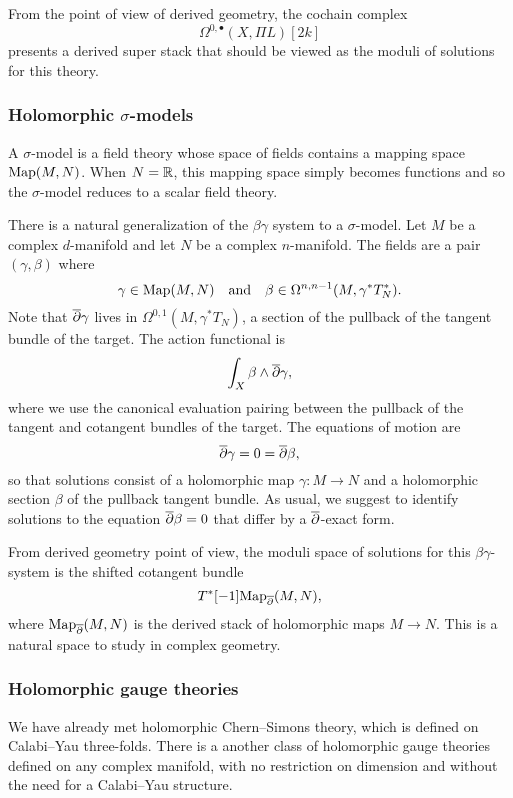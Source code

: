 \documentclass[11pt]{amsart}
\begin{document}
From the point of view of derived geometry, the cochain complex
\[
\Omega^{0,\bullet}(X, \Pi L)[2k]
\]
presents a derived super stack that should be viewed as the moduli of solutions for this theory.

\subsubsection{Holomorphic $\sigma$-models}

A $\sigma$-model is a field theory whose space of fields contains a mapping space ${\rm Map}(M,N)$.
When $N = \mathbb R$, this mapping space simply becomes functions and so the $\sigma$-model reduces to a scalar field theory.

There is a natural generalization of the $\beta\gamma$ system to a $\sigma$-model.
Let $M$ be a complex $d$-manifold and let $N$ be a complex $n$-manifold.
The fields are a pair $(\gamma, \beta)$ where
\[
\gamma \in {\rm Map}(M,N) \quad\text{and}\quad \beta \in \Omega^{n,n-1}(M,\gamma^* T^*_N) .
\]
Note that ${\overline{\partial}} \gamma$ lives in $\Omega^{0,1}(M, \gamma^* T_N)$, 
a section of the pullback of the tangent bundle of the target.
The action functional is 
\[
\int_X \beta \wedge {\overline{\partial}} \gamma,
\]
where we use the canonical evaluation pairing between the pullback of the tangent and cotangent bundles of the target.
The equations of motion are
\[
{\overline{\partial}} \gamma = 0 = {\overline{\partial}} \beta,
\]
so that solutions consist of a holomorphic map $\gamma: M \to N$ and a holomorphic section $\beta$ of the pullback tangent bundle.
As usual, we suggest to identify solutions to the equation ${\overline{\partial}} \beta = 0$ that differ by a ${\overline{\partial}}$-exact form.

From derived geometry point of view, the moduli space of solutions for this $\beta\gamma$-system is the shifted cotangent bundle
\[
T^*[-1] {\rm Map}_{\overline{\partial}}(M,N) ,
\]
where ${\rm Map}_{\overline{\partial}}(M,N)$ is the derived stack of holomorphic maps $M \to N$.
This is a natural space to study in complex geometry.

\subsubsection{Holomorphic gauge theories}
\label{sec: hol BF dfn}

We have already met holomorphic Chern--Simons theory, which is defined on Calabi--Yau three-folds.
There is a another class of holomorphic gauge theories 
defined on any complex manifold, with no restriction on dimension 
and without the need for a Calabi--Yau structure. 
\end{document}
